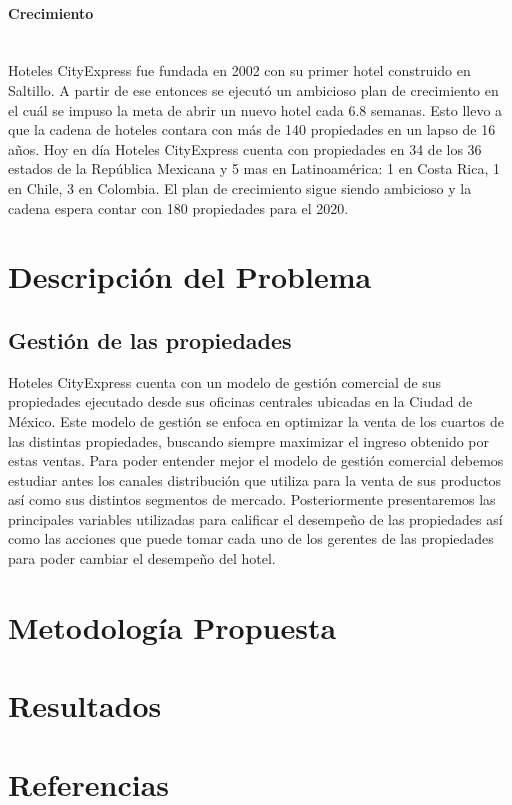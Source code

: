 \documentclass[a4paper,11pt]{article}
\begin{document}
\paragraph {Crecimiento} ~ \\
Hoteles CityExpress fue fundada en 2002 con su primer hotel construido en Saltillo. A partir de ese entonces se ejecutó un ambicioso plan de crecimiento en el cuál se impuso la meta de abrir un nuevo hotel cada 6.8 semanas. Esto llevo a que la cadena de hoteles contara con más de 140 propiedades en un lapso de 16 años.
Hoy en día Hoteles CityExpress cuenta con propiedades en 34 de los 36 estados de la República Mexicana y 5 mas en Latinoamérica: 1 en Costa Rica, 1 en Chile, 3 en Colombia. El plan de crecimiento sigue siendo ambicioso y la cadena espera contar con 180 propiedades para el 2020.
\section{Descripción del Problema}
\subsection{Gestión de las propiedades}
Hoteles CityExpress cuenta con un modelo de gestión comercial de sus propiedades ejecutado desde sus oficinas centrales ubicadas en la Ciudad de México. Este modelo de gestión se enfoca en optimizar la venta de los cuartos de las distintas propiedades, buscando siempre maximizar el ingreso obtenido por estas ventas.
Para poder entender mejor el modelo de gestión comercial debemos estudiar antes los canales distribución que utiliza para la venta de sus productos así como sus distintos segmentos de mercado. Posteriormente presentaremos las principales variables utilizadas para calificar el desempeño de las propiedades así como las acciones que puede tomar cada uno de los gerentes de las propiedades para poder cambiar el desempeño del hotel.
\section{Metodología Propuesta}
\section{Resultados}
\section{Referencias}
\end{document}
